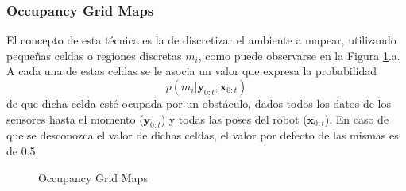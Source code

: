 \subsubsection{Occupancy Grid Maps}
El concepto de esta técnica es la de discretizar el ambiente a mapear, utilizando pequeñas celdas o regiones discretas $m_i$, como puede observarse en la Figura \ref{fig:occupancygridmaps}.a. A cada una de estas celdas se le asocia un valor que expresa la probabilidad
\begin{equation}
    p(m_i|\bm{y}_{0:t},\bm{x}_{0:t})
\end{equation}
de que dicha celda esté ocupada por un obstáculo, dados todos los datos de los sensores hasta el momento ($\bm{y}_{0:t}$) y todas las poses del robot ($\bm{x}_{0:t}$). En caso de que se desconozca el valor de dichas celdas, el valor por defecto de las mismas es de 0.5. 

\begin{figure}[!ht]
    \centering
    \qquad
    \caption{Occupancy Grid Maps}
    \label{fig:occupancygridmaps}
\end{figure}



